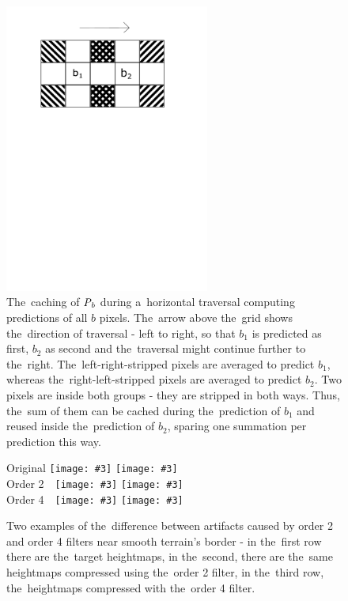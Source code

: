 \begin{figure}
	\includegraphics[trim={0 19cm 0cm 1cm}, clip, width=0.6\textwidth]{figures/bcaching.pdf}\centering
	\caption{The~caching of $\mathit{P_{b}}$ during a~horizontal traversal computing predictions of all $b$ pixels. The~arrow above the~grid shows the~direction of traversal - left to right, so that $b_1$ is predicted as first, $b_2$ as second and the~traversal might continue further to the~right. The~left-right-stripped pixels are averaged to predict $b_1$, whereas the~right-left-stripped pixels are averaged to predict $b_2$. Two pixels are inside both groups - they are stripped in both ways. Thus, the~sum of them can be cached during the~prediction of $b_1$ and reused inside the~prediction of $b_2$, sparing one summation per prediction this way.}
	\label{fig:bcaching}
\end{figure}

\newcommand{\incimg}[3]{\texttt{[image: \#3]}}
\newcommand{\incartifborder}[1]{\incimg{95}{70}{#1}}

\begin{figure}
	Original \incartifborder{figures/artif_orig0.png}
	\incartifborder{figures/artif_orig1.png}\\
	Order 2~~\incartifborder{figures/artif_four0.png}
	\incartifborder{figures/artif_four1.png}\\
	Order 4~~\incartifborder{figures/artif_twelve0.png}
	\incartifborder{figures/artif_twelve1.png}\\
	\caption{Two examples of the~difference between artifacts caused by order 2 and order 4 filters near smooth terrain's border - in the~first row there are the~target heightmaps, in the~second, there are the~same heightmaps compressed using the~order 2 filter, in the~third row, the~heightmaps compressed with the~order 4 filter.}
	\label{fig:artifs_border}
\end{figure}

